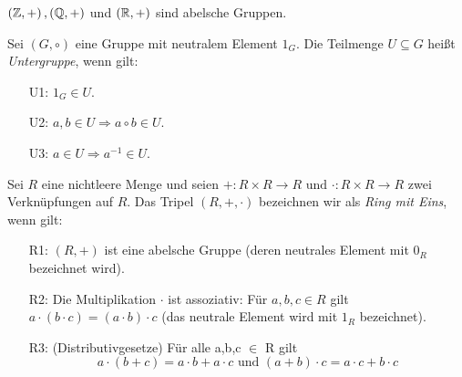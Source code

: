 %
\begin{bsp}
$\left( \mathbb{Z}, +\right), \left(\mathbb{Q}, +\right)$ und $\left(\mathbb{R}, +\right)$ sind abelsche Gruppen. 
\end{bsp}
%
\begin{defn}\label{Untergruppe}
Sei $\left(G, \circ\right)$ eine Gruppe mit neutralem Element $1_G$. Die Teilmenge $U\subseteq G$ heißt \textit{Untergruppe}, wenn gilt:
\begin{enumerate}
\item[U1: ] $1_G \in U$.
\item[U2: ] $a, b \in U \Rightarrow a\circ b \in U$.
\item[U3: ] $a \in U \Rightarrow a^{-1} \in U$.
\end{enumerate} 
\end{defn}


\begin{defn}\label{Ring} %
Sei $R$ eine nichtleere Menge und seien $+ : R \times R \to R \text{ und } \cdot: R \times R \to R $ zwei Verknüpfungen auf $R$. Das Tripel $\left(R, +, \cdot\right)$ bezeichnen wir als \textit{Ring mit Eins}, wenn gilt:
%
\begin{enumerate}
\item[R1: ] $(R, +)$ ist eine abelsche Gruppe (deren neutrales Element mit $0_R$ bezeichnet wird).
\item[R2: ] Die Multiplikation $\cdot$ ist assoziativ: Für $a, b,c \in R$ gilt $a\cdot \left(b \cdot c\right) = \left(a \cdot b \right) \cdot c$ (das neutrale Element wird mit $1_R$ bezeichnet).%
\item[R3: ] (Distributivgesetze) Für alle a,b,c $\in$ R gilt\\
\[a \cdot(b +c) = a \cdot b + a \cdot c \text{ und }
(a+b) \cdot c = a \cdot c + b \cdot c \] 
\end{enumerate}
\end{defn}

